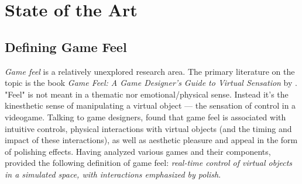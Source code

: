 \section{State of the Art}
\subsection{Defining Game Feel}
\textit{Game feel} is a relatively unexplored research area. The primary literature on the topic is the book \textit{Game Feel: A Game Designer's Guide to Virtual Sensation} by \cite{swink}. "Feel" is not meant in a thematic nor emotional/physical sense. Instead it's the kinesthetic sense of manipulating a virtual object --- the sensation of control in a videogame. Talking to game designers,  found that game feel is associated with intuitive controls, physical interactions with virtual objects (and the timing and impact of these interactions), as well as aesthetic pleasure and appeal in the form of polishing effects. Having analyzed various games and their components, \cite{swink} provided the following definition of game feel: \textit{real-time control of virtual objects in a simulated space, with interactions emphasized by polish}.

